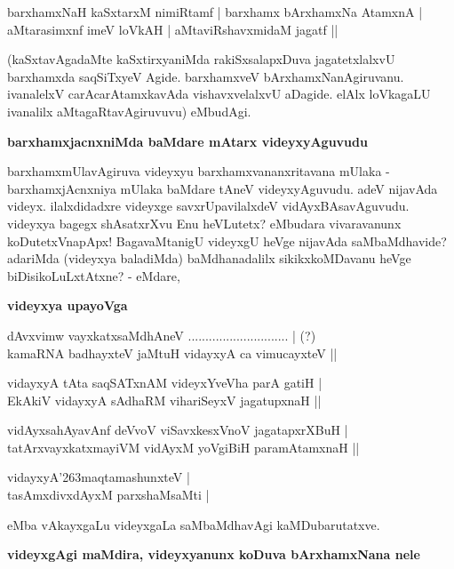 \begin{shloka}
barxhamxNaH kaSxtarxM nimiRtamf | barxhamx bArxhamxNa AtamxnA |\\\label{85}
aMtarasimxnf imeV loVkAH | aMtaviRshavxmidaM jagatf ||
\end{shloka}

\noindent
(kaSxtavAgadaMte kaSxtirxyaniMda rakiSxsalapxDuva jagatetxlalxvU barxhamxda saqSiTxyeV Agide. barxhamxveV bArxhamxNa\-nAgi\-ru\-vanu. ivanalelxV carAcarAtamxkavAda vishavxvelalxvU aDagide. elAlx loVkagaLU ivanalilx aMtagaRta\-vAgiru\-vuvu) eMbudAgi. 

{\bigskip
\noindent
{\large\bf barxhamxjacnxniMda baMdare mAtarx videyxyAguvudu}}\label{page85}
\medskip

\noindent
barxhamxmUlavAgiruva videyxyu barxhamxvananxritavana mUlaka - barxhamxjAcnxniya mUlaka baMdare tAneV videyx\-yAgu\-vudu. adeV nijavAda videyx. ilalxdidadxre videyxge savxrUpavilalxdeV vidAyxBAsavAguvudu. videyxya bagegx shAsatxrXvu Enu heVLutetx? eMbudara vivaravanunx koDutetxVnapApx! BagavaMtanigU videyxgU heVge nija\-vAda saMbaMdhavide? adariMda (videyxya baladiMda) baMdhanadalilx sikikxkoMDavanu heVge biDisi\-koLuLx\-tAtxne? - eMdare,

{\bigskip
\noindent
{\large\bf videyxya upayoVga}}

\begin{shloka}
dAvxvimw vayxkatxsaMdhAneV ............................. | (?)\\\label{86}
kamaRNA badhayxteV jaMtuH vidayxyA ca vimucayxteV ||
\end{shloka}

\begin{shloka}
vidayxyA tAta saqSATxnAM videyxYveVha parA gatiH |\\\label{86}
EkAkiV vidayxyA sAdhaRM vihariSeyxV jagatupxnaH ||\\\label{86}

vidAyxsahAyavAnf deVvoV viSavxkesxVnoV jagatapxrXBuH |\\\label{86}
tatArxvayxkatxmayiVM vidAyxM yoVgiBiH paramAtamxnaH ||\\\label{86}

vidayxyA\char'263maqtamashunxteV |\\\label{86}
tasAmxdivxdAyxM parxshaMsaMti |\label{86}
\end{shloka}

\noindent
eMba vAkayxgaLu videyxgaLa saMbaMdhavAgi kaMDubarutatxve.

{\bigskip
\noindent
{\large\bf videyxgAgi maMdira, videyxyanunx koDuva bArxhamxNana nele}}
\medskip


